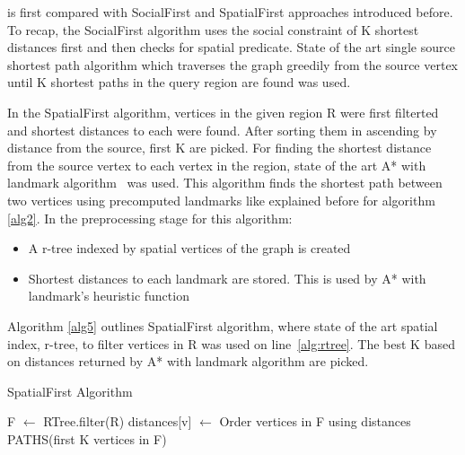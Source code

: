 {\rrp} is first compared with SocialFirst and SpatialFirst approaches introduced before. To recap, the SocialFirst algorithm uses the social constraint of K shortest distances first and then checks for spatial predicate. State of the art single source shortest path algorithm which traverses the graph greedily from the source vertex until K shortest paths in the query region are found was used. 

In the SpatialFirst algorithm, vertices in the given region R were first filterted and shortest distances to each were found. After sorting them in ascending by distance from the source, first K are picked. For finding the shortest distance from the source vertex to each vertex in the region, state of the art A* with landmark algorithm~\cite{AC2005} was used. This algorithm finds the shortest path between two vertices using precomputed landmarks like explained before for algorithm \ref{alg2}. In the preprocessing stage for this algorithm:
\begin{itemize}
	\item A r-tree indexed by spatial vertices of the graph is created
	\item Shortest distances to each landmark are stored. This is used by A* with landmark's heuristic function
\end{itemize}

Algorithm \ref{alg5} outlines SpatialFirst algorithm, where state of the art spatial index, r-tree, to filter vertices in R was used on line~\ref{alg:rtree}. The best K based on distances returned by A* with landmark algorithm are picked.

\begin{algorithm}[t]
\caption{SpatialFirst Algorithm}
\begin{scriptsize}
\label{alg5}
\begin{algorithmic}[1]
  \State F $\gets$ RTree.filter(R) \label{alg:rtree}
	  \State distances[v] $\gets$ 
  \EndFor
  \State Order vertices in F using distances
  \State \Return PATHS(first K vertices in F)
\EndFunction
\end{algorithmic}
\end{scriptsize}
\end{algorithm}


